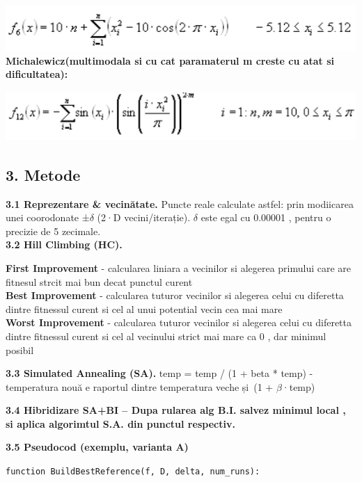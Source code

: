 \documentclass[
]{article}
\begin{document}
\includegraphics[width=5.30282in,height=0.67718in]{vertopal_3cc9e404d6084a9aa4179e4b559e5481/media/image3.png}\\
\textbf{Michalewicz(multimodala si cu cat paramaterul m creste cu atat
si dificultatea):}

\includegraphics[width=5.54244in,height=0.7501in]{vertopal_3cc9e404d6084a9aa4179e4b559e5481/media/image4.png}

\hypertarget{metode}{%
\subsection{\texorpdfstring{3. Metode }{3. Metode }}\label{metode}}

\textbf{3.1 Reprezentare \& vecinătate.} Puncte reale calculate astfel:
prin modiicarea unei coorodonate ±$\delta$ (2·D vecini/iterație). $\delta$ este egal
cu 0.00001 , pentru o precizie de 5 zecimale.\\
\textbf{3.2 Hill Climbing (HC).}

\textbf{First Improvement} - calcularea liniara a vecinilor si alegerea
primului care are fitnesul strcit mai bun decat punctul curent\\
\textbf{Best Improvement} - calcularea tuturor vecinilor si alegerea
celui cu diferetta dintre fitnessul curent si cel al unui potential
vecin cea mai mare\\
\textbf{Worst Improvement} - calcularea tuturor vecinilor si alegerea
celui cu diferetta dintre fitnessul curent si cel al vecinului strict
mai mare ca 0 , dar minimul posibil

\textbf{3.3 Simulated Annealing (SA).} temp = temp / (1 + beta * temp) -
temperatura nouă e raportul dintre temperatura veche și~(1 + $\beta$·temp)

\textbf{3.4 Hibridizare SA+BI -- Dupa rularea alg B.I. salvez minimul
local , si aplica algorimtul S.A. din punctul respectiv.}

\textbf{3.5 Pseudocod (exemplu, varianta A)}

\texttt{function\ }\texttt{BuildBestReference}\texttt{(}\texttt{f,\ D,\ delta,\ }\texttt{num\_runs}\texttt{):}
\end{document}
